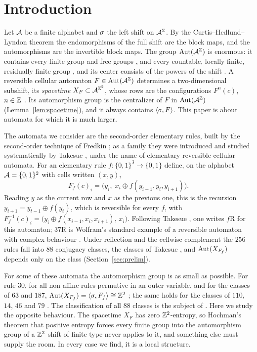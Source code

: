\section{Introduction}\label{sec:intro}

Let $\mathcal{A}$ be a finite alphabet and $\sigma$ the left shift on $\mathcal{A}^{\mathbb{Z}}$. By the Curtis--Hedlund--Lyndon theorem \cite{Hedlund1969} the endomorphisms of the full shift are the block maps, and the automorphisms are the invertible block maps. The group $\operatorname{Aut}(\mathcal{A}^{\mathbb{Z}})$ is enormous: it contains every finite group and free groups \cite{BLR1988}, and every countable, locally finite, residually finite group \cite[Theorem~3.1]{KimRoush1990}, and its center consists of the powers of the shift \cite{Ryan1972}. A reversible cellular automaton $F\in\operatorname{Aut}(\mathcal{A}^{\mathbb{Z}})$ determines a two-dimensional subshift, its \emph{spacetime} $X_F\subset\mathcal{A}^{\mathbb{Z}^2}$, whose rows are the configurations $F^n(c)$, $n\in\mathbb{Z}$ \cite{CFK2019}. Its automorphism group is the centralizer of $F$ in $\operatorname{Aut}(\mathcal{A}^{\mathbb{Z}})$ (Lemma~\ref{lem:spacetime}), and it always contains $\langle\sigma,F\rangle$. This paper is about automata for which it is much larger.

The automata we consider are the second-order elementary rules, built by the second-order technique of Fredkin \cite{TM1990,Wolfram2002}; as a family they were introduced and studied systematically by Takesue \cite{Takesue1987,Takesue1989}, under the name of elementary reversible cellular automata. For an elementary rule $f\colon\{0,1\}^3\to\{0,1\}$ define, on the alphabet $\mathcal{A}=\{0,1\}^2$ with cells written $(x,y)$,
\begin{equation}\label{eq:F}
F_f(c)_i=\bigl(y_i,\;x_i\oplus f(y_{i-1},y_i,y_{i+1})\bigr).
\end{equation}
Reading $y$ as the current row and $x$ as the previous one, this is the recursion $y_{t+1}=y_{t-1}\oplus f(y_t)$, which is reversible for every $f$, with $F_f^{-1}(c)_i=\bigl(y_i\oplus f(x_{i-1},x_i,x_{i+1}),\,x_i\bigr)$. Following Takesue \cite{Takesue1987}, one writes $f$R for this automaton; $37$R is Wolfram's standard example of a reversible automaton with complex behaviour \cite[pp.~440 and 452--457]{Wolfram2002}. Under reflection and the cellwise complement the $256$ rules fall into $88$ conjugacy classes, the classes of Takesue \cite[Table~I]{Takesue1989}, and $\operatorname{Aut}(X_{F_f})$ depends only on the class (Section~\ref{sec:prelim}).

For some of these automata the automorphism group is as small as possible. For rule $30$, for all non-affine rules permutive in an outer variable, and for the classes of $63$ and $187$, $\operatorname{Aut}(X_{F_f})=\langle\sigma,F_f\rangle\cong\mathbb{Z}^2$ \cite{PaperB}; the same holds for the classes of $110$, $14$, $46$ and $79$ \cite{PaperA}. The classification of all $88$ classes is the subject of \cite{PaperD}. Here we study the opposite behaviour. The spacetime $X_F$ has zero $\mathbb{Z}^2$-entropy, so Hochman's theorem that positive entropy forces every finite group into the automorphism group of a $\mathbb{Z}^2$ shift of finite type \cite{Hochman2010} never applies to it, and something else must supply the room. In every case we find, it is a local structure.

